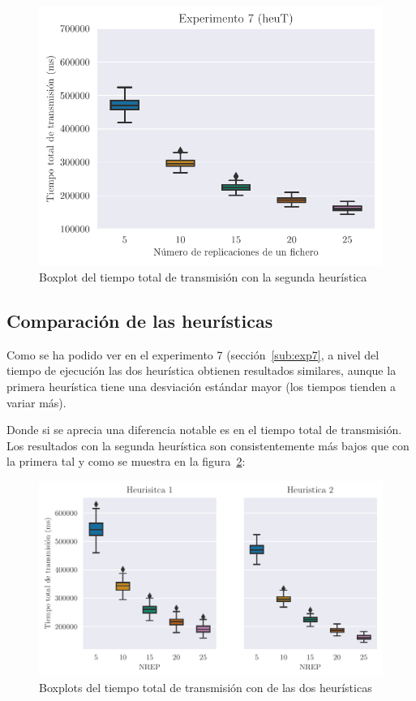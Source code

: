 \begin{figure}[H]
    \centering
    \includegraphics{include/plots/ex7_ttt_bplot_n.pdf}
    \caption{Boxplot del tiempo total de transmisión con la segunda heurística}%
    \label{fig:ex7ttt_total}
\end{figure}

\pagebreak
\subsection{Comparación de las heurísticas}

Como se ha podido ver en el experimento 7 (sección~\ref{sub:exp7}, 
a nivel del tiempo de ejecución las dos heurística obtienen resultados similares, aunque la primera
heurística tiene una desviación estándar mayor (los tiempos tienden a variar más).

Donde si se aprecia una diferencia notable es en el tiempo total de transmisión. Los resultados
con la segunda heurística son consistentemente más bajos que con la primera tal y como se muestra en
la figura~\ref{fig:ex7comp}:

\begin{figure}[H]
    \centering
    \includegraphics{include/plots/ex7_comp.pdf}
    \caption{Boxplots del tiempo total de transmisión con de las dos heurísticas}%
    \label{fig:ex7comp}
\end{figure}

